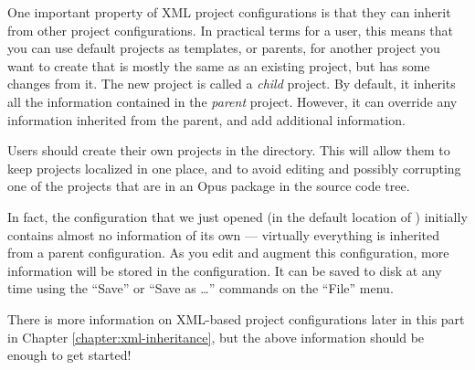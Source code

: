 One important property of XML project configurations is that they can
inherit from other project configurations.  In practical terms for a user,
this means that you can use default projects as templates, or parents, for
another project you want to create that is mostly the same as an existing
project, but has some changes from it.  The new project is called a
\emph{child} project.  By default, it inherits all the information
contained in the \emph{parent} project.  However, it can override any
information inherited from the parent, and add additional information.

Users should create their own projects in the 
directory.  This will allow them to keep projects localized in one place,
and to avoid editing and possibly corrupting one of the projects that are
in an Opus package in the source code tree.

In fact, the  configuration that we just opened
(in the default location of ) initially contains
almost no information of its own --- virtually everything is inherited from
a parent configuration.  As you edit and augment this configuration, more
information will be stored in the configuration.  It can be saved to disk
at any time using the ``Save'' or ``Save as \ldots'' commands on the
``File'' menu.

There is more information on XML-based project configurations later in this part
in Chapter \ref{chapter:xml-inheritance}, but the above information
should be enough to get started!
